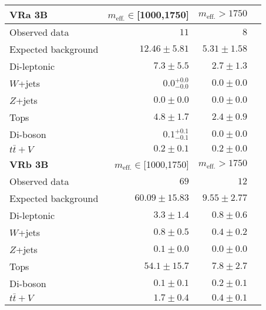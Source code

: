 \begin{table}
  \begin{center}
    \caption{ \label{tab::BGestimation::VRyields_3B}   }

    \begin{tabular*}{\textwidth}{@{\extracolsep{\fill}}lrrr}
      \toprule
      \textbf{VRa 3B} & $m_{\mathrm{eff.}}\in$[1000,1750] & $m_{\mathrm{eff.}}>1750$ \\
      \midrule
Observed data          & $11$              & $8$                    \\
\midrule
Expected background         & $12.46 \pm 5.81$          & $5.31 \pm 1.58$              \\
\midrule
        Di-leptonic         & $7.3 \pm 5.5$          & $2.7 \pm 1.3$              \\
        $W$+jets         & $0.0_{-0.0}^{+0.0}$          & $0.0 \pm 0.0$              \\
        $Z$+jets         & $0.0 \pm 0.0$          & $0.0 \pm 0.0$              \\
        Tops         & $4.8 \pm 1.7$          & $2.4 \pm 0.9$              \\
        Di-boson         & $0.1_{-0.1}^{+0.1}$          & $0.0 \pm 0.0$              \\
        $t\bar{t}+V$         & $0.2 \pm 0.1$          & $0.2 \pm 0.0$              \\
\toprule
\textbf{VRb 3B} & $m_{\mathrm{eff.}}\in$[1000,1750] & $m_{\mathrm{eff.}}>1750$ \\
\midrule
Observed data          & $69$              & $12$                    \\
\midrule
Expected background         & $60.09 \pm 15.83$          & $9.55 \pm 2.77$              \\
\midrule
        Di-leptonic         & $3.3 \pm 1.4$          & $0.8 \pm 0.6$              \\
        $W$+jets         & $0.8 \pm 0.5$          & $0.4 \pm 0.2$              \\
        $Z$+jets         & $0.1 \pm 0.0$          & $0.0 \pm 0.0$              \\
        Tops         & $54.1 \pm 15.7$          & $7.8 \pm 2.7$              \\
        Di-boson         & $0.1 \pm 0.1$          & $0.2 \pm 0.1$              \\
        $t\bar{t}+V$         & $1.7 \pm 0.4$          & $0.4 \pm 0.1$              \\
        \bottomrule
        \end{tabular*}

  \end{center}
\end{table}




